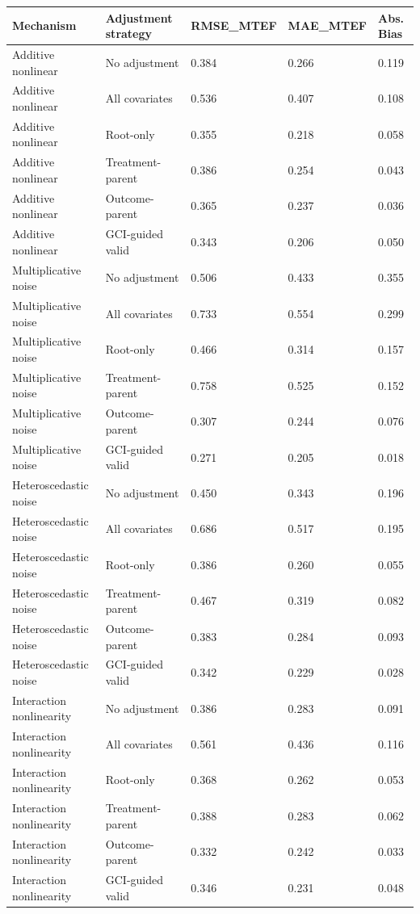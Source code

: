 \begin{tabular}{lllll}
\toprule
Mechanism & Adjustment strategy & RMSE_MTEF & MAE_MTEF & Abs. Bias \\
\midrule
Additive nonlinear & No adjustment & 0.384 & 0.266 & 0.119 \\
Additive nonlinear & All covariates & 0.536 & 0.407 & 0.108 \\
Additive nonlinear & Root-only & 0.355 & 0.218 & 0.058 \\
Additive nonlinear & Treatment-parent & 0.386 & 0.254 & 0.043 \\
Additive nonlinear & Outcome-parent & 0.365 & 0.237 & 0.036 \\
Additive nonlinear & GCI-guided valid & 0.343 & 0.206 & 0.050 \\
Multiplicative noise & No adjustment & 0.506 & 0.433 & 0.355 \\
Multiplicative noise & All covariates & 0.733 & 0.554 & 0.299 \\
Multiplicative noise & Root-only & 0.466 & 0.314 & 0.157 \\
Multiplicative noise & Treatment-parent & 0.758 & 0.525 & 0.152 \\
Multiplicative noise & Outcome-parent & 0.307 & 0.244 & 0.076 \\
Multiplicative noise & GCI-guided valid & 0.271 & 0.205 & 0.018 \\
Heteroscedastic noise & No adjustment & 0.450 & 0.343 & 0.196 \\
Heteroscedastic noise & All covariates & 0.686 & 0.517 & 0.195 \\
Heteroscedastic noise & Root-only & 0.386 & 0.260 & 0.055 \\
Heteroscedastic noise & Treatment-parent & 0.467 & 0.319 & 0.082 \\
Heteroscedastic noise & Outcome-parent & 0.383 & 0.284 & 0.093 \\
Heteroscedastic noise & GCI-guided valid & 0.342 & 0.229 & 0.028 \\
Interaction nonlinearity & No adjustment & 0.386 & 0.283 & 0.091 \\
Interaction nonlinearity & All covariates & 0.561 & 0.436 & 0.116 \\
Interaction nonlinearity & Root-only & 0.368 & 0.262 & 0.053 \\
Interaction nonlinearity & Treatment-parent & 0.388 & 0.283 & 0.062 \\
Interaction nonlinearity & Outcome-parent & 0.332 & 0.242 & 0.033 \\
Interaction nonlinearity & GCI-guided valid & 0.346 & 0.231 & 0.048 \\
\bottomrule
\end{tabular}
